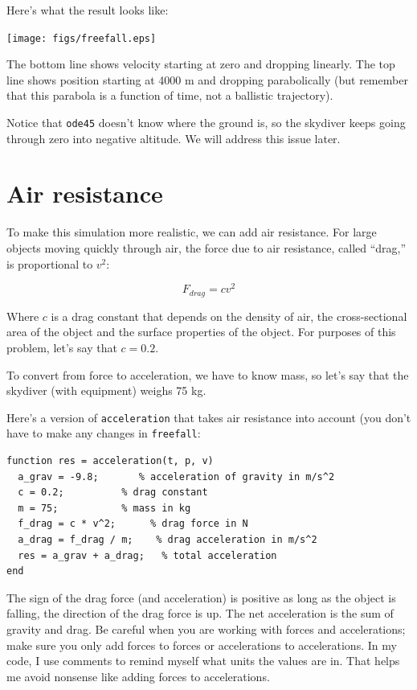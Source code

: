 \documentclass{book}
\begin{document}
Here's what the result looks like:

\beforefig \centerline{\texttt{[image: figs/freefall.eps]}}

The bottom line shows velocity starting at zero and dropping
linearly. The top line shows position starting at 4000 m and
dropping parabolically (but remember that this parabola
is a function of time, not a ballistic trajectory).

Notice that {\tt ode45} doesn't know where the ground is, so the
skydiver keeps going through zero into negative altitude. We will
address this issue later.


\section{Air resistance}

To make this simulation more realistic, we can add air resistance.
For large objects moving quickly through air, the force due to air
resistance, called ``drag,'' is proportional to $v^2$:

\[ F_{drag} = c v^2 \]

Where $c$ is a drag constant that depends on the density of
air, the cross-sectional area of the object and
the surface properties of the object. For purposes of this
problem, let's say that $c = 0.2$.

To convert from force to acceleration, we have to know mass, so let's
say that the skydiver (with equipment) weighs 75 kg.

Here's a version of {\tt acceleration} that takes air resistance
into account (you don't have to make any changes in {\tt freefall}:

\begin{verbatim}
function res = acceleration(t, p, v)
  a_grav = -9.8;       % acceleration of gravity in m/s^2
  c = 0.2;          % drag constant
  m = 75;           % mass in kg
  f_drag = c * v^2;      % drag force in N
  a_drag = f_drag / m;    % drag acceleration in m/s^2
  res = a_grav + a_drag;   % total acceleration
end
\end{verbatim}

The sign of the drag force (and acceleration) is positive as
long as the object is falling, the direction of the drag force is
up.
The net
acceleration is the sum of gravity and drag. Be careful when you
are working with forces and accelerations; make sure you only add
forces to forces or accelerations to accelerations. In my code,
I use comments to remind myself what units the values are in.
That helps me avoid nonsense like adding forces to accelerations.
\end{document}
